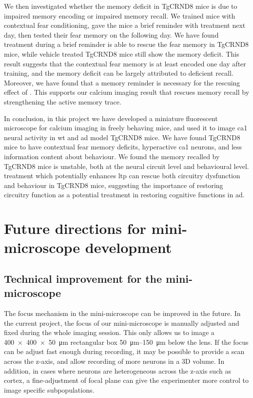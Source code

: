 We then investigated whether the memory deficit in TgCRND8 mice is due to impaired memory encoding or impaired memory recall. We trained mice with contextual fear conditioning, gave the mice a brief reminder with \tglu{} treatment next day, then tested their fear memory on the following day. We have found \tglu{} treatment during a brief reminder is able to rescue the fear memory in TgCRND8 mice, while vehicle treated TgCRND8 mice still show the memory deficit. This result suggests that the contextual fear memory is at least encoded one day after training, and the memory deficit can be largely attributed to deficient recall. Moreover, we have found that a memory reminder is necessary for the rescuing effect of \tglu{}. This supports our calcium imaging result that \tglu{} rescues memory recall by strengthening the active memory trace. 

In conclusion, in this project we have developed a miniature fluorescent microscope for calcium imaging in freely behaving mice, and used it to image \gls{ca1} neural activity in \gls{wt} and \gls{ad} model TgCRND8 mice. We have found TgCRND8 mice to have contextual fear memory deficits, hyperactive \gls{ca1} neurons, and less information content about behaviour. We found the memory recalled by TgCRND8 mice is unstable, both at the neural circuit level and behavioural level. \tglu{} treatment which potentially enhances \gls{ltp} can rescue both circuitry dysfunction and behaviour in TgCRND8 mice, suggesting the importance of restoring circuitry function as a potential treatment in restoring cognitive functions in \gls{ad}.

\section{Future directions for mini-microscope development}
\subsection{Technical improvement for the mini-microscope}

The focus mechanism in the mini-microscope can be improved in the future. In the current project, the focus of our mini-microscope is manually adjusted and fixed during the whole imaging session. This only allows us to image a \SI{400x400x50}{\um} rectangular box \SIrange{50}{150}{\um} below the lens. If the focus can be adjust fast enough during recording, it may be possible to provide a scan across the z-axis, and allow recording of more neurons in a 3D volume. In addition, in cases where neurons are heterogeneous across the z-axis such as cortex, a fine-adjustment of focal plane can give the experimenter more control to image specific subpopulations.

